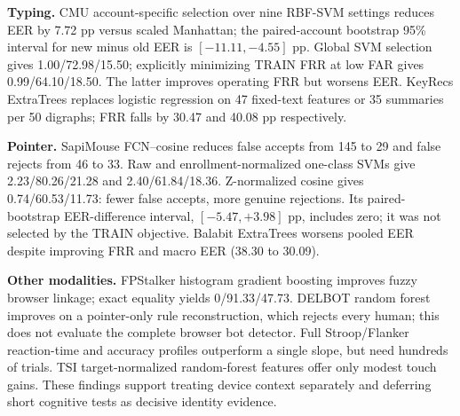 \documentclass[10pt,a4paper]{article}
\begin{document}
\begin{center}
\end{center}

\textbf{Typing.} CMU account-specific selection over nine RBF-SVM settings reduces EER by 7.72 pp versus scaled Manhattan; the paired-account bootstrap 95\% interval for new minus old EER is $[-11.11,-4.55]$ pp. Global SVM selection gives 1.00/72.98/15.50; explicitly minimizing TRAIN FRR at low FAR gives 0.99/64.10/18.50. The latter improves operating FRR but worsens EER. KeyRecs ExtraTrees replaces logistic regression on 47 fixed-text features or 35 summaries per 50 digraphs; FRR falls by 30.47 and 40.08 pp respectively.

\textbf{Pointer.} SapiMouse FCN--cosine reduces false accepts from 145 to 29 and false rejects from 46 to 33. Raw and enrollment-normalized one-class SVMs give 2.23/80.26/21.28 and 2.40/61.84/18.36. Z-normalized cosine gives 0.74/60.53/11.73: fewer false accepts, more genuine rejections. Its paired-bootstrap EER-difference interval, $[-5.47,+3.98]$ pp, includes zero; it was not selected by the TRAIN objective. Balabit ExtraTrees worsens pooled EER despite improving FRR and macro EER (38.30 to 30.09).

\textbf{Other modalities.} FPStalker histogram gradient boosting improves fuzzy browser linkage; exact equality yields 0/91.33/47.73. DELBOT random forest improves on a pointer-only rule reconstruction, which rejects every human; this does not evaluate the complete browser bot detector. Full Stroop/Flanker reaction-time and accuracy profiles outperform a single slope, but need hundreds of trials. TSI target-normalized random-forest features offer only modest touch gains. These findings support treating device context separately and deferring short cognitive tests as decisive identity evidence.
\end{document}
